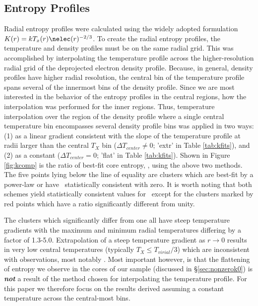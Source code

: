 \documentclass[apj]{emulateapj}
\begin{document}
\subsection{Entropy Profiles}
\label{sec:kpr}

Radial entropy profiles were calculated using the widely adopted
formulation $K(r) = kT_x(r)\nelec(r)^{-2/3}$. To create the radial
entropy profiles, the temperature and density profiles must be on the
same radial grid. This was accomplished by interpolating the
temperature profile across the higher-resolution radial grid of the
deprojected electron density profile. Because, in general, density
profiles have higher radial resolution, the central bin of the
temperature profile spans several of the innermost bins of the density
profile. Since we are most interested in the behavior of the entropy
profiles in the central regions, how the interpolation was performed
for the inner regions. Thus, temperature interpolation over the region
of the density profile where a single central temperature bin
encompasses several density profile bins was applied in two ways: (1)
as a linear gradient consistent with the slope of the temperature
profile at radii larger than the central $T_X$ bin ($\Delta T_{center}
\ne 0$; 'extr' in Table \ref{tab:kfits}), and (2) as a constant
($\Delta T_{center}=0$; 'flat' in Table \ref{tab:kfits}). Shown in
Figure \ref{fig:kcomp} is the ratio of best-fit core entropy, \kna,
using the above two methods. The five points lying below the line of
equality are clusters which are best-fit by a power-law or have
\kna\ statistically consistent with zero. It is worth noting that both
schemes yield statistically consistent values for \kna\ except for the
clusters marked by red points which have a ratio significantly
different from unity.

The clusters which significantly differ from one all have steep
temperature gradients with the maximum and minimum radial temperatures
differing by a factor of 1.3-5.0. Extrapolation of a steep temperature
gradient as $r \rightarrow 0$ results in very low central temperatures
(typically $T_X \leq T_{virial}/3$) which are inconsistent with
observations, most notably \citet{peterson03}. Most important however,
is that the flattening of entropy we observe in the cores of our
sample (discussed in \S\ref{sec:nonzerok0}) is {\bfseries\em{not}} a
result of the method chosen for interpolating the temperature
profile. For this paper we therefore focus on the results derived
assuming a constant temperature across the central-most bins.
\end{document}
